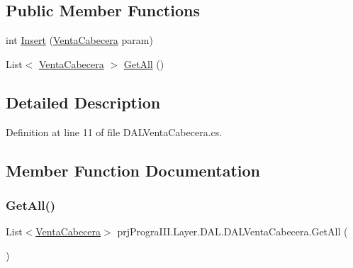 \subsection*{Public Member Functions}
\begin{DoxyCompactItemize}
\item 
int \hyperlink{classprj_progra_i_i_i_1_1_layer_1_1_d_a_l_1_1_d_a_l_venta_cabecera_a2eecc7b4375e75276b9547217d9727cf}{Insert} (\hyperlink{classprj_progra_i_i_i_1_1_layer_1_1_entities_1_1_venta_cabecera}{Venta\+Cabecera} param)
\item 
List$<$ \hyperlink{classprj_progra_i_i_i_1_1_layer_1_1_entities_1_1_venta_cabecera}{Venta\+Cabecera} $>$ \hyperlink{classprj_progra_i_i_i_1_1_layer_1_1_d_a_l_1_1_d_a_l_venta_cabecera_a136378281851cb3aa0f0791a076b1351}{Get\+All} ()
\end{DoxyCompactItemize}


\subsection{Detailed Description}


Definition at line 11 of file D\+A\+L\+Venta\+Cabecera.\+cs.



\subsection{Member Function Documentation}
\hypertarget{classprj_progra_i_i_i_1_1_layer_1_1_d_a_l_1_1_d_a_l_venta_cabecera_a136378281851cb3aa0f0791a076b1351}{}\label{classprj_progra_i_i_i_1_1_layer_1_1_d_a_l_1_1_d_a_l_venta_cabecera_a136378281851cb3aa0f0791a076b1351} 
\subsubsection{\texorpdfstring{Get\+All()}{GetAll()}}
{\footnotesize\ttfamily List$<$\hyperlink{classprj_progra_i_i_i_1_1_layer_1_1_entities_1_1_venta_cabecera}{Venta\+Cabecera}$>$ prj\+Progra\+I\+I\+I.\+Layer.\+D\+A\+L.\+D\+A\+L\+Venta\+Cabecera.\+Get\+All (\begin{DoxyParamCaption}{ }\end{DoxyParamCaption})}



